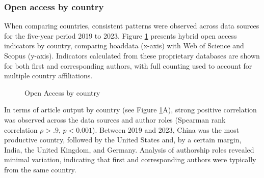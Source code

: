 \documentclass[a4paper,man,floatsintext,longtable,noextraspace,10pt]{apa6}
\begin{document}
\subsubsection{Open access by country}\label{open-access-by-country}

When comparing countries, consistent patterns were observed across data
sources for the five-year period 2019 to 2023. Figure
\ref{fig-uptake_country} presents hybrid open access indicators by
country, comparing hoaddata (x-axis) with Web of Science and Scopus
(y-axis). Indicators calculated from these proprietary databases are
shown for both first and corresponding authors, with full counting used
to account for multiple country affiliations.

\begin{figure}[ht!]


\caption{\label{fig-uptake_country}Open Access by country}

\end{figure}%

In terms of article output by country (see Figure
\ref{fig-uptake_country}A), strong positive correlation was observed
across the data sources and author roles (Spearman rank correlation
\(\rho > .9\), \(p < 0.001\)). Between 2019 and 2023, China was the most
productive country, followed by the United States and, by a certain
margin, India, the United Kingdom, and Germany. Analysis of authorship
roles revealed minimal variation, indicating that first and
corresponding authors were typically from the same country.
\end{document}
